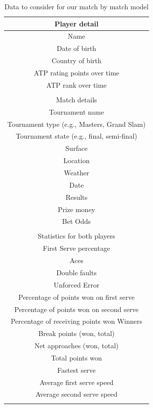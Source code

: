 \documentclass[12pt]{article}
\begin{document}
\begin{table}[h!]
    \centering
    \begin{tabular}{c}
        \hline
        Player detail\\ \hline
        Name \\
        Date of birth \\
        Country of birth \\
        ATP rating points over time \\
        ATP rank over time \\
        \\
        \hline
        Match details \\ \hline
        Tournament name \\
        Tournament type (e.g., Masters, Grand Slam) \\
        Tournament state (e.g., final, semi-final)\\ 
        Surface \\
        Location \\
        Weather \\
        Date \\
        Results \\
        Prize money \\
        Bet Odds \\
        \\
        \hline
        Statistics for both players \\ \hline
        First Serve percentage \\
        Aces \\
        Double faults \\
        Unforced Error \\
        Percentage of points won on first serve \\
        Percentage of points won on second serve \\
        Percentage of receiving points won Winners\\
        Break points (won, total) \\
        Net approaches (won, total) \\  
        Total points won \\ 
        Fastest serve \\    
        Average first serve speed \\
        Average second serve speed\\
        \\
    \end{tabular}
    \caption{\label{data}Data to consider for our match by match model}
\end{table}
\end{document}
